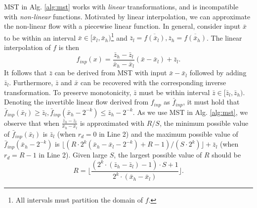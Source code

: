 \documentclass{article}
\newcommand{\quant}[1]{\bar{#1}}
\begin{document}
MST in Alg. \ref{alg:mst} works with \textit{linear} transformations, and is incompatible with \textit{non-linear} functions. Motivated by linear interpolation, we can approximate the non-linear flow  with a piecewise linear function. In general, consider input $\quant{x}$ to be within an interval $\quant{x} \in [\quant{x}_l, \quant{x}_h)$\footnote{All intervals must 
partition the domain of $f$.} and $\quant{z}_l = \overline{f(\quant{x}_l)}, \quant{z}_h = \overline{f(\quant{x}_h)}$. The linear interpolation of $f$ is then
\begin{equation}
f_{inp} (x) = \frac{\quant{z}_h - \quant{z}_l}{\quant{x}_h - \quant{x}_l} (\quant{x} - \quant{x}_l) + \quant{z}_l.
\label{eq:f_inp}
\end{equation}
It follows that $\quant{z}$ can be derived from MST with input $\quant{x} - \quant{x}_l$ followed by adding $\quant{z}_l$. Furthermore, $\quant{z}$ and $\quant{x}$ can be recovered with the corresponding inverse transformation.
To preserve monotonicity, $\quant{z}$ must be within interval $\quant{z} \in [\quant{z}_l, \quant{z}_h)$. Denoting the invertible linear flow derived from $f_{inp}$ as $\bar{f}_{inp}$, it must hold that $\bar{f}_{inp} (\quant{x}_l) \ge \quant{z}_l, \bar{f}_{inp} (\quant{x}_h - 2^{-k}) \le \quant{z}_h - 2^{-k}$. As we use MST in Alg. \ref{alg:mst}, we observe that when $\frac{\quant{z}_h - \quant{z}_l}{\quant{x}_h - \quant{x}_l}$ is approximated with $R/S$, the minimum possible value of $\bar{f}_{inp} (\quant{x}_l)$ is $\quant{z}_l$ (when $r_d = 0$ in Line 2) and the maximum possible value of $\bar{f}_{inp}(\quant{x}_h - 2^{-k})$ is $\lfloor (R \cdot 2^k (\quant{x}_h - \quant{x}_l - 2^{-k}) + R - 1) / (S \cdot 2^k) \rfloor + \quant{z}_l$ (when $r_d = R - 1$ in Line 2). Given large $S$, the largest possible value of $R$ should be
\begin{equation}
R = \big\lfloor \frac{(2^k \cdot (\quant{z}_h - \quant{z}_l) - 1) \cdot S + 1}{2^k \cdot (\quant{x}_h - \quant{x}_l)} \big\rfloor.
\label{eq:f_inp_r}
\end{equation}
\end{document}
